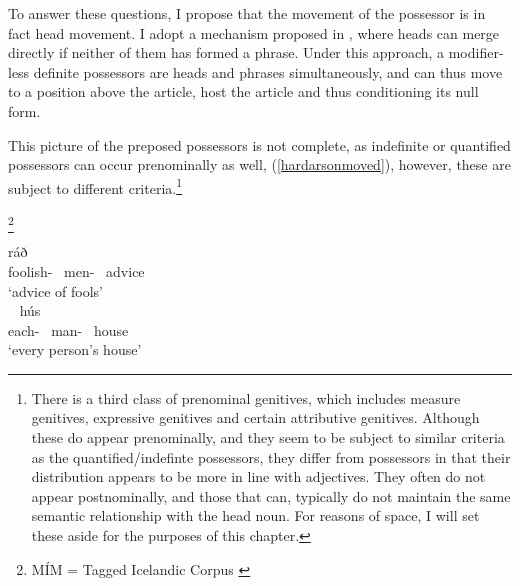 \documentclass[output=paper,colorlinks,citecolor=brown,
]{langscibook}
\begin{document}
To answer these questions, I propose that the movement of the possessor is in fact head movement. I adopt a mechanism proposed in \citet{hardarson2020}, where heads can merge directly if neither of them has formed a phrase. Under this approach, a modifier-less definite possessors are heads and phrases simultaneously, and can thus move to a position above the article, host the article and thus conditioning its null form.

This picture of the preposed possessors is not complete, as indefinite or quantified possessors can occur prenominally as well, (\ref{hardarsonmoved}), however, these are subject to different criteria.\footnote{There is a third class of prenominal genitives, which includes measure genitives, expressive genitives and certain attributive genitives. Although these do appear prenominally, and they seem to be subject to similar criteria as the quantified/indefinte possessors, they differ from possessors in that their distribution appears to be more in line with adjectives. They often do not appear postnominally, and those that can, typically do not maintain the same semantic relationship with the head noun. For reasons of space, I will set these aside for the purposes of this chapter.}

\begin{exe}
		\begin{multicols}{2}
	\ex	{[MÍM]}\footnote{M{\'I}M = Tagged Icelandic Corpus \citep{helgadottir2012}} \label{hardarsonmoved} %
		\begin{xlist}
			\ex	{} ráð\\
						foolish-\hardGen~ men-\hardGen~ advice\\
				\glt	`advice of fools'\\~
			\ex	\gll	[hver-s mann-s] hús\\
						each-\hardGen~ man-\hardGen~ house\\
				\glt	`every person's house'
		\end{xlist}
				\end{multicols}
\end{exe}
\end{document}

